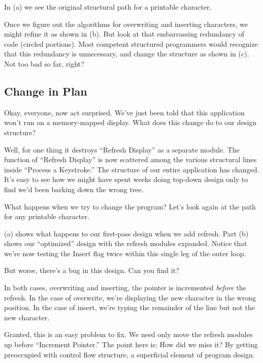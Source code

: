 In (a) we see the original structural path for a printable
character.

Once we figure out the algorithms for overwriting and inserting
characters, we might refine it as shown in (b). But look at
that embarrassing redundancy of code (circled portions). Most
competent structured programmers would recognize that this redundancy
is unnecessary, and change the structure as shown in (c).
Not too bad so far, right?

\subsection{Change in Plan}

Okay, everyone, now act surprised. We've just been told that this
application won't run on a memory-mapped display. What does this
change do to our design structure?


Well, for one thing it destroys ``Refresh Display'' as a separate
module. The function of ``Refresh Display'' is now scattered among the
various structural lines inside ``Process a Keystroke.'' The structure of
our entire application has changed. It's easy to see how we might have
spent weeks doing top-down design only to find we'd been barking down
the wrong tree.

What happens when we try to change the program? Let's look again
at the path for any printable character.

 (a) shows what happens to our first-pass design when we
add refresh. Part (b) shows our ``optimized'' design with the refresh
modules expanded. Notice that we're now testing the Insert flag twice
within this single leg of the outer loop.

But worse, there's a bug in this design. Can you find it?

In both cases, overwriting and inserting, the pointer is incremented
\emph{before} the refresh. In the case of overwrite, we're displaying
the new character in the wrong position. In the case of insert, we're
typing the remainder of the line but not the new character.

Granted, this is an easy problem to fix. We need only move the refresh
modules up before ``Increment Pointer.'' The point here is: How did we
miss it? By getting preoccupied with control flow structure, a
superficial element of program design.


